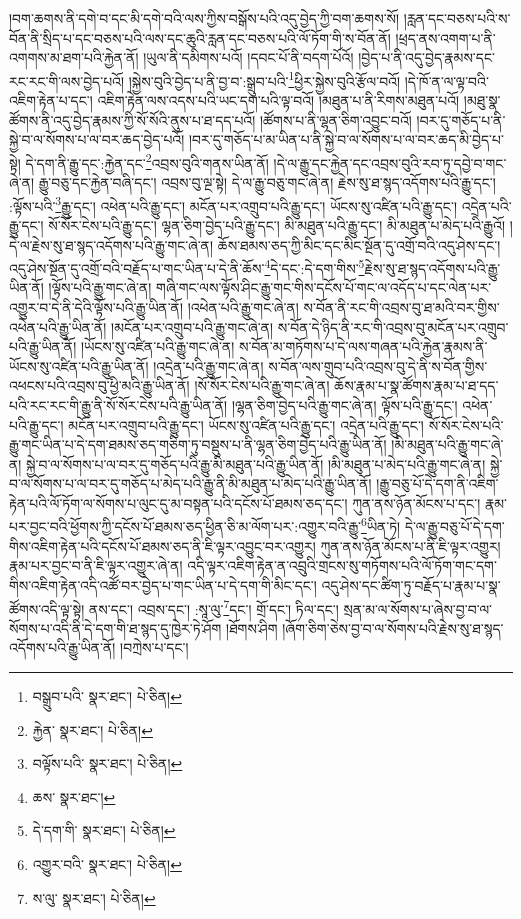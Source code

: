 །བག་ཆགས་ནི་དགེ་བ་དང་མི་དགེ་བའི་ལས་ཀྱིས་བསྒོས་པའི་འདུ་བྱེད་ཀྱི་བག་ཆགས་སོ། །རླན་དང་བཅས་པའི་ས་བོན་ནི་སྲིད་པ་དང་བཅས་པའི་ལས་དང་ཆུའི་རླན་དང་བཅས་པའི་ལོ་ཏོག་གི་ས་བོན་ནོ། །ཕྲད་ནས་འགག་པ་ནི་འགགས་མ་ཐག་པའི་རྐྱེན་ནོ། །ཡུལ་ནི་དམིགས་པའོ། །དབང་པོ་ནི་བདག་པོའོ། །བྱེད་པ་ནི་འདུ་བྱེད་རྣམས་དང་རང་རང་གི་ལས་བྱེད་པའོ། །སྐྱེས་བུའི་བྱེད་པ་ནི་བྱ་བ་:སྒྲུབ་པའི་\footnote{བསྒྲུབ་པའི་  སྣར་ཐང་།  པེ་ཅིན། }ཕྱིར་སྐྱེས་བུའི་རྩོལ་བའོ། །དེ་ཁོ་ན་ལ་ལྟ་བའི་འཇིག་རྟེན་པ་དང་། འཇིག་རྟེན་ལས་འདས་པའི་ཡང་དག་པའི་ལྟ་བའོ། །མཐུན་པ་ནི་རིགས་མཐུན་པའོ། །མཐུ་སྣ་ཚོགས་ནི་འདུ་བྱེད་རྣམས་ཀྱི་སོ་སོའི་ནུས་པ་ཐ་དད་པའོ། །ཚོགས་པ་ནི་ལྷན་ཅིག་འབྱུང་བའོ། །བར་དུ་གཅོད་པ་ནི་སྐྱེ་བ་ལ་སོགས་པ་ལ་བར་ཆད་བྱེད་པའོ། །བར་དུ་གཅོད་པ་མ་ཡིན་པ་ནི་སྐྱེ་བ་ལ་སོགས་པ་ལ་བར་ཆད་མི་བྱེད་པ་སྟེ། དེ་དག་ནི་རྒྱུ་དང་:རྐྱེན་དང་\footnote{རྐྱེན་  སྣར་ཐང་།  པེ་ཅིན། }འབྲས་བུའི་གནས་ཡིན་ནོ། །དེ་ལ་རྒྱུ་དང་རྐྱེན་དང་འབྲས་བུའི་རབ་ཏུ་དབྱེ་བ་གང་ཞེ་ན། རྒྱུ་བཅུ་དང་རྐྱེན་བཞི་དང་། འབྲས་བུ་ལྔ་སྟེ། དེ་ལ་རྒྱུ་བཅུ་གང་ཞེ་ན། རྗེས་སུ་ཐ་སྙད་འདོགས་པའི་རྒྱུ་དང་། :ལྟོས་པའི་\footnote{བལྟོས་པའི་  སྣར་ཐང་།  པེ་ཅིན། }རྒྱུ་དང་། འཕེན་པའི་རྒྱུ་དང་། མངོན་པར་འགྲུབ་པའི་རྒྱུ་དང་། ཡོངས་སུ་འཛིན་པའི་རྒྱུ་དང་། འདྲེན་པའི་རྒྱུ་དང་། སོ་སོར་ངེས་པའི་རྒྱུ་དང་། ལྷན་ཅིག་བྱེད་པའི་རྒྱུ་དང་། མི་མཐུན་པའི་རྒྱུ་དང་། མི་མཐུན་པ་མེད་པའི་རྒྱུའོ། །དེ་ལ་རྗེས་སུ་ཐ་སྙད་འདོགས་པའི་རྒྱུ་གང་ཞེ་ན། ཆོས་ཐམས་ཅད་ཀྱི་མིང་དང་མིང་སྔོན་དུ་འགྲོ་བའི་འདུ་ཤེས་དང་། འདུ་ཤེས་སྔོན་དུ་འགྲོ་བའི་བརྗོད་པ་གང་ཡིན་པ་དེ་ནི་ཆོས་\footnote{ཆས་  སྣར་ཐང་། }དེ་དང་:དེ་དག་གིས་\footnote{དེ་དག་གི་  སྣར་ཐང་།  པེ་ཅིན། }རྗེས་སུ་ཐ་སྙད་འདོགས་པའི་རྒྱུ་ཡིན་ནོ། །ལྟོས་པའི་རྒྱུ་གང་ཞེ་ན། གཞི་གང་ལས་ལྟོས་ཤིང་རྒྱུ་གང་གིས་དངོས་པོ་གང་ལ་འདོད་པ་དང་ལེན་པར་འགྱུར་བ་དེ་ནི་དེའི་ལྟོས་པའི་རྒྱུ་ཡིན་ནོ། །འཕེན་པའི་རྒྱུ་གང་ཞེ་ན། ས་བོན་ནི་རང་གི་འབྲས་བུ་ཐ་མའི་བར་གྱིས་འཕེན་པའི་རྒྱུ་ཡིན་ནོ། །མངོན་པར་འགྲུབ་པའི་རྒྱུ་གང་ཞེ་ན། ས་བོན་དེ་ཉིད་ནི་རང་གི་འབྲས་བུ་མངོན་པར་འགྲུབ་པའི་རྒྱུ་ཡིན་ནོ། །ཡོངས་སུ་འཛིན་པའི་རྒྱུ་གང་ཞེ་ན། ས་བོན་མ་གཏོགས་པ་དེ་ལས་གཞན་པའི་རྐྱེན་རྣམས་ནི་ཡོངས་སུ་འཛིན་པའི་རྒྱུ་ཡིན་ནོ། །འདྲེན་པའི་རྒྱུ་གང་ཞེ་ན། ས་བོན་ལས་གྲུབ་པའི་འབྲས་བུ་དེ་ནི་ས་བོན་གྱིས་འཕངས་པའི་འབྲས་བུ་ཕྱི་མའི་རྒྱུ་ཡིན་ནོ། །སོ་སོར་ངེས་པའི་རྒྱུ་གང་ཞེ་ན། ཆོས་རྣམ་པ་སྣ་ཚོགས་རྣམ་པ་ཐ་དད་པའི་རང་རང་གི་རྒྱུ་ནི་སོ་སོར་ངེས་པའི་རྒྱུ་ཡིན་ནོ། །ལྷན་ཅིག་བྱེད་པའི་རྒྱུ་གང་ཞེ་ན། ལྟོས་པའི་རྒྱུ་དང་། འཕེན་པའི་རྒྱུ་དང་། མངོན་པར་འགྲུབ་པའི་རྒྱུ་དང་། ཡོངས་སུ་འཛིན་པའི་རྒྱུ་དང་། འདྲེན་པའི་རྒྱུ་དང་། སོ་སོར་ངེས་པའི་རྒྱུ་གང་ཡིན་པ་དེ་དག་ཐམས་ཅད་གཅིག་ཏུ་བསྡུས་པ་ནི་ལྷན་ཅིག་བྱེད་པའི་རྒྱུ་ཡིན་ནོ། །མི་མཐུན་པའི་རྒྱུ་གང་ཞེ་ན། སྐྱེ་བ་ལ་སོགས་པ་ལ་བར་དུ་གཅོད་པའི་རྒྱུ་མི་མཐུན་པའི་རྒྱུ་ཡིན་ནོ། །མི་མཐུན་པ་མེད་པའི་རྒྱུ་གང་ཞེ་ན། སྐྱེ་བ་ལ་སོགས་པ་ལ་བར་དུ་གཅོད་པ་མེད་པའི་རྒྱུ་ནི་མི་མཐུན་པ་མེད་པའི་རྒྱུ་ཡིན་ནོ། །རྒྱུ་བཅུ་པོ་དེ་དག་ནི་འཇིག་རྟེན་པའི་ལོ་ཏོག་ལ་སོགས་པ་ལུང་དུ་མ་བསྟན་པའི་དངོས་པོ་ཐམས་ཅད་དང་། ཀུན་ནས་ཉོན་མོངས་པ་དང་། རྣམ་པར་བྱང་བའི་ཕྱོགས་ཀྱི་དངོས་པོ་ཐམས་ཅད་ཕྱིན་ཅི་མ་ལོག་པར་:འགྱུར་བའི་རྒྱུ་\footnote{འགྱུར་བའི་  སྣར་ཐང་།  པེ་ཅིན། }ཡིན་ཏེ། དེ་ལ་རྒྱུ་བཅུ་པོ་དེ་དག་གིས་འཇིག་རྟེན་པའི་དངོས་པོ་ཐམས་ཅད་ནི་ཇི་ལྟར་འབྱུང་བར་འགྱུར། ཀུན་ནས་ཉོན་མོངས་པ་ནི་ཇི་ལྟར་འགྱུར། རྣམ་པར་བྱང་བ་ནི་ཇི་ལྟར་འགྱུར་ཞེ་ན། འདི་ལྟར་འཇིག་རྟེན་ན་འབྲུའི་གྲངས་སུ་གཏོགས་པའི་ལོ་ཏོག་གང་དག་གིས་འཇིག་རྟེན་འདི་འཚོ་བར་བྱེད་པ་གང་ཡིན་པ་དེ་དག་གི་མིང་དང་། འདུ་ཤེས་དང་ཚིག་ཏུ་བརྗོད་པ་རྣམ་པ་སྣ་ཚོགས་འདི་ལྟ་སྟེ། ནས་དང་། འབྲས་དང་། :སཱ་ལུ་\footnote{ས་ལུ་  སྣར་ཐང་།  པེ་ཅིན། }དང་། གྲོ་དང་། ཏིལ་དང་། སྲན་མ་ལ་སོགས་པ་ཞེས་བྱ་བ་ལ་སོགས་པ་འདི་ནི་དེ་དག་གི་ཐ་སྙད་དུ་ཁྱེར་ཏེ་ཤོག །ཐོགས་ཤིག །ཞོག་ཅིག་ཅེས་བྱ་བ་ལ་སོགས་པའི་རྗེས་སུ་ཐ་སྙད་འདོགས་པའི་རྒྱུ་ཡིན་ནོ། །བཀྲེས་པ་དང་། 